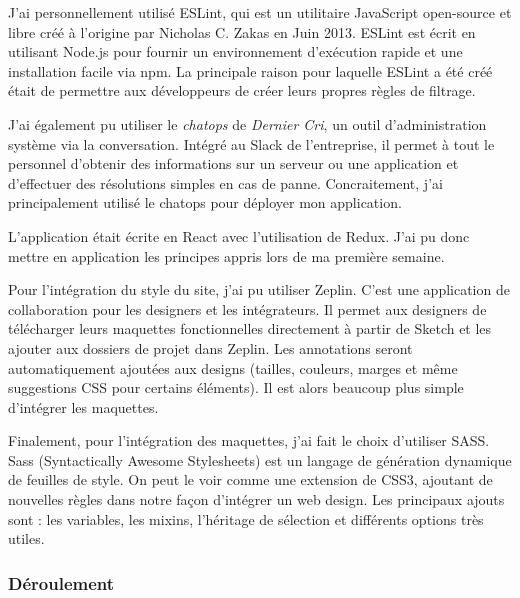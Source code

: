 \bigskip

J'ai personnellement utilisé ESLint, qui est un utilitaire JavaScript
open-source et libre créé à l'origine par Nicholas C. Zakas en Juin
2013. ESLint est écrit en utilisant Node.js pour fournir un
environnement d'exécution rapide et une installation facile via npm. La
principale raison pour laquelle ESLint a été créé était de permettre aux
développeurs de créer leurs propres règles de filtrage.

\bigskip

J'ai également pu utiliser le \emph{chatops} de \emph{Dernier Cri}, un
outil d'administration système via la conversation. Intégré au Slack de
l'entreprise, il permet à tout le personnel d'obtenir des informations
sur un serveur ou une application et d'effectuer des résolutions simples
en cas de panne. Concraitement, j'ai principalement utilisé le chatops
pour déployer mon application.

\bigskip

L'application était écrite en React avec l'utilisation de Redux. J'ai pu
donc mettre en application les principes appris lors de ma première
semaine.

\bigskip

Pour l'intégration du style du site, j'ai pu utiliser Zeplin. C'est une
application de collaboration pour les designers et les intégrateurs. Il
permet aux designers de télécharger leurs maquettes fonctionnelles
directement à partir de Sketch et les ajouter aux dossiers de projet
dans Zeplin. Les annotations seront automatiquement ajoutées aux designs
(tailles, couleurs, marges et même suggestions CSS pour certains
éléments). Il est alors beaucoup plus simple d'intégrer les maquettes.

\bigskip

Finalement, pour l'intégration des maquettes, j'ai fait le choix
d'utiliser SASS. Sass (Syntactically Awesome Stylesheets) est un langage
de génération dynamique de feuilles de style. On peut le voir comme une
extension de CSS3, ajoutant de nouvelles règles dans notre façon
d'intégrer un web design. Les principaux ajouts sont : les variables,
les mixins, l'héritage de sélection et différents options très utiles.

\bigskip

\subsubsection{Déroulement}\label{duxe9roulement}

\bigskip

